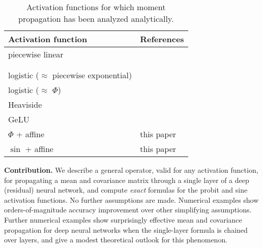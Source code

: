 \documentclass{article}
\begin{document}
\begin{table}[h]
    \begin{center}
      \begin{tabular}{ll}
      \toprule
      Activation function & References \\
      \midrule
      piecewise linear & \citet{bibi_analytic_2018,huber_bayesian_2020}\\
      & \citet{wright_analytic_2024,akgul_deterministic_2025} \\
      & \citet{wu_deterministic_2019} \\
      logistic (\(\approx\) piecewise exponential) &  \citet{astudillo_propagation_2011,abdelaziz_uncertainty_2015}\\
      logistic (\(\approx\) \(\Phi\)) & \citet{huber_bayesian_2020} \\
      Heaviside &  \citet{wu_deterministic_2019, wright_analytic_2024}\\
      GeLU & \citet{wright_analytic_2024}\\
      \(\Phi\) + affine & this paper \\
      \(\sin\) + affine & this paper
      \\      
      \bottomrule
      \end{tabular}
    \end{center}
    \caption{\label{tab:activation-functions} Activation functions for which moment propagation has been analyzed analytically.}
\end{table}

\textbf{Contribution.} We describe a general operator, valid for any activation function, for propagating a mean and covariance matrix through a single layer of a deep (residual) neural network, and compute \emph{exact} formulas for the probit and sine activation functions.
No further assumptions are made.
Numerical examples show orders-of-magnitude accuracy improvement over other simplifying assumptions.
Further numerical examples show surprisingly effective mean and covariance propagation for deep neural networks when the single-layer formula is chained over layers, and give a modest theoretical outlook for this phenomenon.
\end{document}
